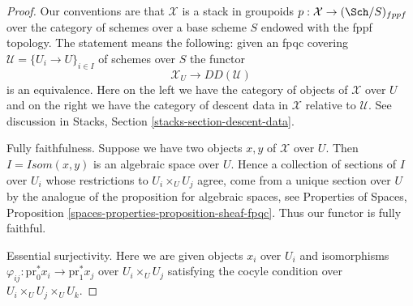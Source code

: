 \begin{proof}
Our conventions are that $\mathcal{X}$ is a stack
in groupoids $p : \mathcal{X} \to (\Sch/S)_{fppf}$
over the category of schemes over a base scheme $S$ endowed
with the fppf topology. The statement means the following:
given an fpqc covering $\mathcal{U} = \{U_i \to U\}_{i \in I}$
of schemes over $S$ the functor
$$
\mathcal{X}_U \longrightarrow DD(\mathcal{U})
$$
is an equivalence. Here on the left we have the category
of objects of $\mathcal{X}$ over $U$ and on the right we have
the category of descent data in $\mathcal{X}$ relative to $\mathcal{U}$.
See discussion in Stacks, Section \ref{stacks-section-descent-data}.

\medskip\noindent
Fully faithfulness. Suppose we have two objects $x, y$ of $\mathcal{X}$
over $U$. Then $I = \mathit{Isom}(x, y)$ is an algebraic space over $U$.
Hence a collection of sections of $I$ over $U_i$ whose restrictions
to $U_i \times_U U_j$ agree, come from a unique section over $U$ by
the analogue of the proposition for algebraic spaces, see
Properties of Spaces, Proposition
\ref{spaces-properties-proposition-sheaf-fpqc}.
Thus our functor is fully faithful.

\medskip\noindent
Essential surjectivity. Here we are given objects
$x_i$ over $U_i$ and isomorphisms
$\varphi_{ij} : \text{pr}_0^*x_i \to \text{pr}_1^*x_j$
over $U_i \times_U U_j$ satisfying the cocyle condition
over $U_i \times_U U_j \times_U U_k$.


\end{proof}
